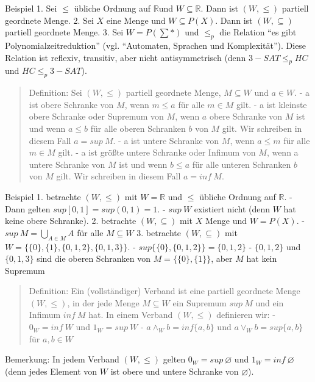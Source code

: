 \documentclass[a4paper]{article}
\begin{document}
\begin{multicols}{3}
  Beispiel 1. Sei $\leq$ übliche Ordnung auf $\mathbb{R}$und
  $W\subseteq\mathbb{R}$. Dann ist $(W,\leq)$ partiell geordnete Menge. 2.
  Sei $X$ eine Menge und $W\subseteq P(X)$. Dann ist $(W,\subseteq)$
  partiell geordnete Menge. 3. Sei $W=P(\sum *)$ und $\leq_p$ die Relation
  ``es gibt Polynomialzeitreduktion'' (vgl. ``Automaten, Sprachen und
  Komplexität''). Diese Relation ist reflexiv, transitiv, aber nicht
  antisymmetrisch (denn $3-SAT\leq_{p} HC$ und $HC\leq_{p} 3-SAT$).

  \begin{quote}
    Definition: Sei $(W,\leq)$ partiell geordnete Menge, $M\subseteq W$ und
    $a\in W$. - a ist obere Schranke von $M$, wenn $m\leq a$ für alle
    $m\in M$ gilt. - a ist kleinste obere Schranke oder Supremum von $M$,
    wenn $a$ obere Schranke von $M$ ist und wenn $a\leq b$ für alle oberen
    Schranken $b$ von $M$ gilt. Wir schreiben in diesem Fall $a=sup \ M$. -
    a ist untere Schranke von $M$, wenn $a\leq m$ für alle $m\in M$ gilt. -
    a ist größte untere Schranke oder Infimum von $M$, wenn a untere
    Schranke von $M$ ist und wenn $b\leq a$ für alle unteren Schranken $b$
    von $M$ gilt. Wir schreiben in diesem Fall $a=inf\ M$.
  \end{quote}

  Beispiel 1. betrachte $(W,\leq)$ mit $W=\mathbb{R}$ und $\leq$ übliche
  Ordnung auf $\mathbb{R}$. - Dann gelten $sup[0,1] = sup(0,1) =1$. -
  $sup\ W$ existiert nicht (denn $W$ hat keine obere Schranke). 2.
  betrachte $(W,\subseteq)$ mit $X$ Menge und $W =P(X)$. -
  $sup\ M=\bigcup_{A\in M} A$ für alle $M\subseteq W$ 3. betrachte
  $(W,\subseteq)$ mit $W=\{\{0\},\{1\},\{0,1,2\},\{0,1,3\}\}$. -
  $sup\{\{0\},\{0,1,2\}\}=\{0,1,2\}$ - $\{0,1,2\}$ und $\{0,1,3\}$ sind
  die oberen Schranken von $M=\{\{0\},\{1\}\}$, aber $M$ hat kein Supremum

  \begin{quote}
    Definition: Ein (vollständiger) Verband ist eine partiell geordnete
    Menge $(W,\leq)$, in der jede Menge $M\subseteq W$ ein Supremum $sup\ M$
    und ein Infimum $inf\ M$ hat. In einem Verband $(W,\leq)$ definieren
    wir: - $0_W = inf\ W$ und $1_W= sup\ W$ - $a\wedge_W b= inf\{a,b\}$ und
    $a\vee_W b= sup\{a,b\}$ für $a,b\in W$
  \end{quote}

  Bemerkung: In jedem Verband $(W,\leq)$ gelten $0_W= sup\ \varnothing$
  und $1_W= inf\ \varnothing$ (denn jedes Element von $W$ ist obere und
  untere Schranke von $\varnothing$).


\end{multicols}
\end{document}
